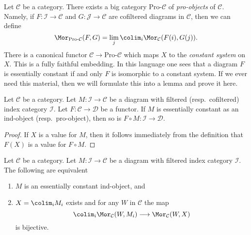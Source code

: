 \begin{remark}
\label{remark-pro-category}
Let $\mathcal{C}$ be a category. There exists a big category
$\text{Pro-}\mathcal{C}$ of {\it pro-objects} of $\mathcal{C}$.
Namely, if $F : \mathcal{I} \to \mathcal{C}$ and
$G : \mathcal{J} \to \mathcal{C}$ are cofiltered diagrams in $\mathcal{C}$,
then we can define
$$
\Mor_{\text{Pro-}\mathcal{C}}(F, G) =
\lim_j \colim_i \Mor_\mathcal{C}(F(i), G(j)).
$$
There is a canonical functor $\mathcal{C} \to \text{Pro-}\mathcal{C}$
which maps $X$ to the {\it constant system} on $X$. This is a fully
faithful embedding. In this language one sees that a diagram $F$ is
essentially constant if and only $F$ is isomorphic to a constant system.
If we ever need this material, then we will formulate this into a lemma
and prove it here.
\end{remark}

\begin{lemma}
\label{lemma-image-essentially-constant}
Let $\mathcal{C}$ be a category. Let $M : \mathcal{I} \to \mathcal{C}$
be a diagram with filtered (resp.\ cofiltered) index category $\mathcal{I}$.
Let $F : \mathcal{C} \to \mathcal{D}$ be a functor.
If $M$ is essentially constant as an ind-object (resp.\ pro-object),
then so is $F \circ M : \mathcal{I} \to \mathcal{D}$.
\end{lemma}

\begin{proof}
If $X$ is a value for $M$, then it follows immediately from the
definition that $F(X)$ is a value for $F \circ M$.
\end{proof}

\begin{lemma}
\label{lemma-characterize-essentially-constant-ind}
Let $\mathcal{C}$ be a category. Let $M : \mathcal{I} \to \mathcal{C}$
be a diagram with filtered index category $\mathcal{I}$.
The following are equivalent
\begin{enumerate}
\item $M$ is an essentially constant ind-object, and
\item $X = \colim_i M_i$ exists and for any $W$ in $\mathcal{C}$
the map
$$
\colim_i \Mor_\mathcal{C}(W, M_i) \longrightarrow
\Mor_\mathcal{C}(W, X)
$$
is bijective.
\end{enumerate}
\end{lemma}

